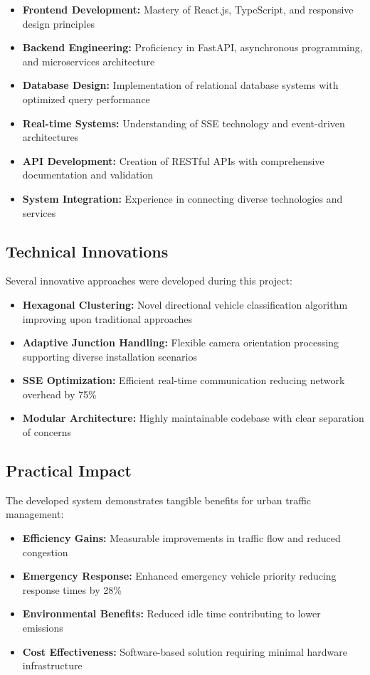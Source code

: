 \documentclass[conference]{IEEEtran}
\begin{document}
\begin{itemize}
\item \textbf{Frontend Development:} Mastery of React.js, TypeScript, and responsive design principles
\item \textbf{Backend Engineering:} Proficiency in FastAPI, asynchronous programming, and microservices architecture
\item \textbf{Database Design:} Implementation of relational database systems with optimized query performance
\item \textbf{Real-time Systems:} Understanding of SSE technology and event-driven architectures
\item \textbf{API Development:} Creation of RESTful APIs with comprehensive documentation and validation
\item \textbf{System Integration:} Experience in connecting diverse technologies and services
\end{itemize}

\subsection{Technical Innovations}

Several innovative approaches were developed during this project:

\begin{itemize}
\item \textbf{Hexagonal Clustering:} Novel directional vehicle classification algorithm improving upon traditional approaches
\item \textbf{Adaptive Junction Handling:} Flexible camera orientation processing supporting diverse installation scenarios
\item \textbf{SSE Optimization:} Efficient real-time communication reducing network overhead by 75\%
\item \textbf{Modular Architecture:} Highly maintainable codebase with clear separation of concerns
\end{itemize}

\subsection{Practical Impact}

The developed system demonstrates tangible benefits for urban traffic management:

\begin{itemize}
\item \textbf{Efficiency Gains:} Measurable improvements in traffic flow and reduced congestion
\item \textbf{Emergency Response:} Enhanced emergency vehicle priority reducing response times by 28\%
\item \textbf{Environmental Benefits:} Reduced idle time contributing to lower emissions
\item \textbf{Cost Effectiveness:} Software-based solution requiring minimal hardware infrastructure
\end{itemize}
\end{document}
